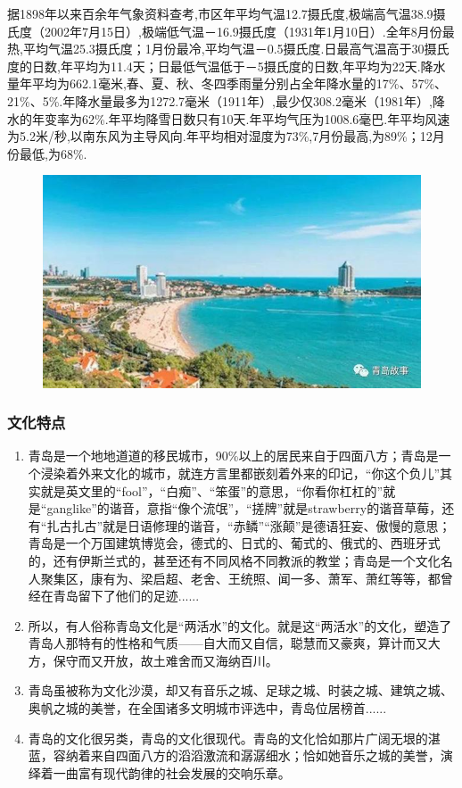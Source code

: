 \documentclass{article}
\begin{document}
    据1898年以来百余年气象资料查考,市区年平均气温12.7摄氏度,极端高气温38.9摄氏度（2002年7月15日）,极端低气温－16.9摄氏度（1931年1月10日）.全年8月份最热,平均气温25.3摄氏度；1月份最冷,平均气温－0.5摄氏度.日最高气温高于30摄氏度的日数,年平均为11.4天；日最低气温低于－5摄氏度的日数,年平均为22天.降水量年平均为662.1毫米,春、夏、秋、冬四季雨量分别占全年降水量的17\%、57\%、21\%、5\%.年降水量最多为1272.7毫米（1911年）,最少仅308.2毫米（1981年）,降水的年变率为62\%.年平均降雪日数只有10天.年平均气压为1008.6毫巴.年平均风速为5.2米/秒,以南东风为主导风向.年平均相对湿度为73\%,7月份最高,为89\%；12月份最低,为68\%.
\par 
\begin{figure}[h!]
\centering
\includegraphics[scale=0.25]{jingsetupian}
\caption{}
\label{fig:jingsetupian}
\end{figure}

\subsubsection{文化特点}

\begin{enumerate}[(1)]
	\item 青岛是一个地地道道的移民城市，90\%以上的居民来自于四面八方；青岛是一个浸染着外来文化的城市，就连方言里都嵌刻着外来的印记，“你这个负儿”其实就是英文里的“fool”，“白痴”、“笨蛋”的意思，“你看你杠杠的”就是“ganglike”的谐音，意指“像个流氓”，“搓牌”就是strawberry的谐音草莓，还有“扎古扎古”就是日语修理的谐音，“赤鳞”“涨颠”是德语狂妄、傲慢的意思；青岛是一个万国建筑博览会，德式的、日式的、葡式的、俄式的、西班牙式的，还有伊斯兰式的，甚至还有不同风格不同教派的教堂；青岛是一个文化名人聚集区，康有为、梁启超、老舍、王统照、闻一多、萧军、萧红等等，都曾经在青岛留下了他们的足迹......
	\item 所以，有人俗称青岛文化是“两活水”的文化。就是这“两活水”的文化，塑造了青岛人那特有的性格和气质——自大而又自信，聪慧而又豪爽，算计而又大方，保守而又开放，故土难舍而又海纳百川。
	\item 青岛虽被称为文化沙漠，却又有音乐之城、足球之城、时装之城、建筑之城、奥帆之城的美誉，在全国诸多文明城市评选中，青岛位居榜首......
	\item 青岛的文化很另类，青岛的文化很现代。青岛的文化恰如那片广阔无垠的湛蓝，容纳着来自四面八方的滔滔激流和潺潺细水；恰如她音乐之城的美誉，演绎着一曲富有现代韵律的社会发展的交响乐章。
\end{enumerate}
\end{document}
